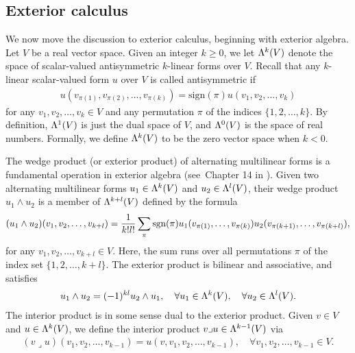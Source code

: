 \documentclass[10pt,a4paper]{article}
\newcommand\cye[1]{%
\protect\leavevmode
\begingroup
    \color{blue}%
    #1%
\endgroup
}
\begin{document}
\subsection{Exterior calculus}


We now move the discussion to exterior calculus, beginning with exterior algebra.
Let $V$ be a real vector space. 
Given an integer $k \geq 0$, we let $\Lambda^{k}(V)$ denote the space of scalar-valued antisymmetric $k$-linear forms over $V$. 
Recall that any $k$-linear scalar-valued form $u$ over $V$ is called antisymmetric
if 
\begin{gather*} 
    u( v_{\pi(1)}, v_{\pi(2)}, \ldots, v_{\pi(k)} ) 
    = 
    \text{sign}(\pi) 
    u( v_1, v_2, \ldots, v_k ) 
\end{gather*}
for any $v_1, v_2, \dots, v_k \in V$ and any permutation $\pi$ of the indices \(\{1, 2, \ldots, k\}\). 
By definition, $\Lambda^{1}(V)$ is just the dual space of $V$, and $\Lambda^{0}(V)$ is the space of real numbers. 
Formally, we define $\Lambda^{k}(V)$ to be the zero vector space when $k < 0$. 

The wedge product (or exterior product) of alternating multilinear forms is a fundamental operation in exterior algebra
(see~Chapter 14 in \cite{lee2012smooth}). 
Given two alternating multilinear forms \( u_1 \in \Lambda^{k}(V) \) and \( u_2 \in \Lambda^{l}(V) \), 
their wedge product \( u_1 \wedge u_2 \) is a member of $\Lambda^{k+l}(V)$
defined by the formula 
\begin{gather*}
    (u_1 \wedge u_2)(v_1, v_2, \ldots, v_{k+l}) 
    = 
    \frac{1}{k! l!} 
    \sum_{ \pi } 
    \operatorname{sgn}(\pi) 
    u_1( v_{\pi(  1)}, \ldots, v_{\pi(k  )} ) 
    u_2( v_{\pi(k+1)}, \ldots, v_{\pi(k+l)} ),
\end{gather*}
for any \( v_1, v_2, \ldots, v_{k+l} \in V \).
Here, the sum runs over all permutations $\pi$ of the index set \(\{ 1, 2, \ldots, k+l \}\).
The exterior product is bilinear and associative, and satisfies 
\begin{align*}
    u_1 \wedge u_2 = (-1)^{kl} u_2 \wedge u_1,
    \quad 
    \forall u_1 \in \Lambda^{k}(V),
    \quad 
    \forall u_2 \in \Lambda^{l}(V).
\end{align*}
The interior product is in some sense dual to the exterior product. Given $v \in V$ and $u \in \Lambda^{k}(V)$, we define the interior product $v \lrcorner u \in \Lambda^{k-1}(V)$ via 
\begin{align*}
    (v \lrcorner u)( v_1, v_2, \ldots, v_{k-1} ) = u( v, v_1, v_2, \ldots, v_{k-1} ),
    \quad 
    \forall v_1, v_2, \ldots, v_{k-1} \in V.
\end{align*}
\end{document}
